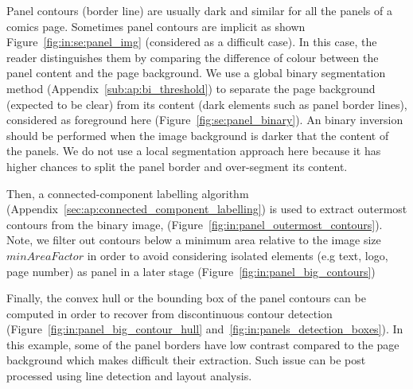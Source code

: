 
Panel contours (border line) are usually dark and similar for all the panels of a comics page.
Sometimes panel contours are implicit as shown Figure~\ref{fig:in:se:panel_img} (considered as a difficult case).
In this case, the reader distinguishes them by comparing the difference of colour between the panel content and the page background.
We use a global binary segmentation method (Appendix~\ref{sub:ap:bi_threshold}) to separate the page background (expected to be clear) from its content (dark elements such as panel border lines), considered as foreground here (Figure~\ref{fig:se:panel_binary}).
An binary inversion should be performed when the image background is darker that the content of the panels.
We do not use a local segmentation approach here because it has higher chances to split the panel border and over-segment its content.

Then, a connected-component labelling algorithm (Appendix~\ref{sec:ap:connected_component_labelling}) is used to extract outermost contours from the binary image, (Figure~\ref{fig:in:panel_outermost_contours}).
Note, we filter out contours below a minimum area relative to the image size $minAreaFactor$ in order to avoid considering isolated elements (e.g text, logo, page number) as panel in a later stage (Figure~\ref{fig:in:panel_big_contours})

Finally, the convex hull or the bounding box of the panel contours can be computed in order to recover from discontinuous contour detection (Figure~\ref{fig:in:panel_big_contour_hull} and~\ref{fig:in:panels_detection_boxes}).
In this example, some of the panel borders have low contrast compared to the page background which makes difficult their extraction.
Such issue can be post processed using line detection and layout analysis.

